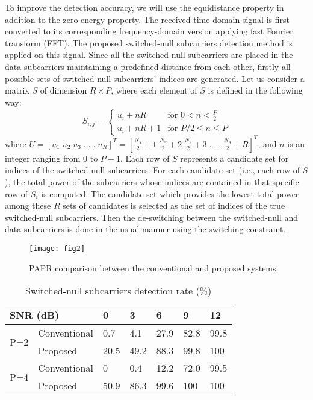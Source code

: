 \documentclass[journal,comsoc]{IEEEtran}
\begin{document}
   
   To improve the detection accuracy, we will use the equidistance property in addition to the zero-energy property. The received time-domain signal is first converted to its corresponding frequency-domain version applying fast Fourier transform (FFT). The proposed switched-null subcarriers detection method is applied on this signal. Since all the switched-null subcarriers are placed in the data subcarriers maintaining a predefined distance from each other, firstly all possible sets of switched-null subcarriers' indices are generated. Let us consider a matrix $S$ of dimension $R\times P$, where each element of $S$ is defined in the following way:
 \begin{equation*}\label{eq.1}
  S_{i,j}=
  \begin{cases}
  u_i+nR & \text{for  $0<n<\frac{P}{2}$}\\
  u_i+nR+1 & \text{for $P/2\leq n \leq P$}
  \end{cases}
  \end{equation*}
 where $U=[u_1\;u_2\;u_3\;.\;.\;.\;u_R]^T=[\frac{N_g}{2}+1\;\frac{N_g}{2}+2\;\frac{N_g}{2}+3\;.\;.\;.\;\frac{N_g}{2}+R]^T$, and $n$ is an integer ranging from 0 to $P-1$. Each row of $S$ represents a candidate set for indices of the switched-null subcarriers. For each candidate set (i.e., each row of $S$), the total power of the subcarriers whose indices are contained in that specific row of $S_i$ is computed. The candidate set which provides the lowest total power among these $R$ sets of candidates is selected as the set of indices of the true switched-null subcarriers. Then the de-switching between the switched-null and data subcarriers is done in the usual manner using the switching constraint.
\begin{figure}[!t]
\centering
\texttt{[image: fig2]}
\caption{PAPR comparison between the conventional and proposed systems.}
\label{fig2}
\end{figure}

\begin{table}[]
\centering
\caption{Switched-null subcarriers detection rate (\%)}
\label{my-label}
\begin{tabular}{|l|l|l|l|l|l|l|}
\hline
\multicolumn{2}{|l|}{SNR (dB)} & 0 & 3 & 6 & 9 & 12 \\ \hline
\multirow{2}{*}{P=2}  & Conventional  & 0.7 & 4.1 & 27.9 & 82.8 & 99.8 \\  \cline{2-7}
                   & Proposed  & 20.5 & 49.2 & 88.3 & 99.8 & 100 \\ \hline
\multirow{2}{*}{P=4}  & Conventional  & 0 & 0.4 & 12.2 & 72.0 & 99.5 \\ \cline{2-7}
                   & Proposed  & 50.9 & 86.3 & 99.6 & 100 & 100 \\ \hline
\end{tabular}
\end{table}
\end{document}

